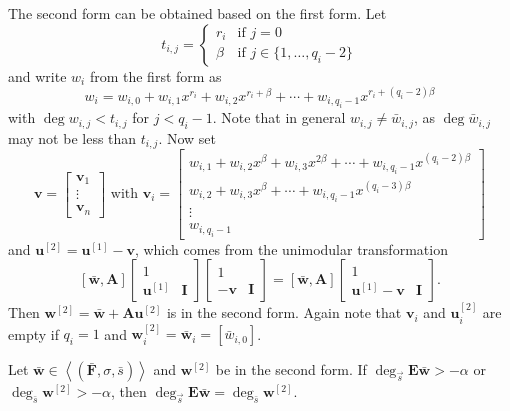 \begin{pf}
The second form can be obtained based on the first form. Let \[
t_{i,j}=\begin{cases}
r_{i} & \mbox{if }j=0\\
\beta & \mbox{if }j\in\{1,\dots,q_{i}-2\}\end{cases}\]
 and write $w_{i}$ from the first form as \begin{equation}
w_{i}=w_{i,0}+w_{i,1}x^{r_{i}}+w_{i,2}x^{r_{i}+\beta}+\cdots+w_{i,q_{i}-1}x^{r_{i}+(q_{i}-2)\beta}\label{eq:wiSeparatedForm}\end{equation}
 with $\deg w_{i,j}<t_{i,j}$ for $j<q_{i}-1$. Note that in general
$w_{i,j}\ne\bar{w}_{i,j}$, as $\deg\bar{w}_{i,j}$ may not be less
than $t_{i,j}$. Now set \[
\mathbf{v}=\begin{bmatrix}\mathbf{v}_{1}\\
\vdots\\
\mathbf{v}_{n}\end{bmatrix}\mbox{ with }\mathbf{v}_{i}=\left[\begin{array}{r}
w_{i,1}+w_{i,2}x^{\beta}+w_{i,3}x^{2\beta}+\cdots+w_{i,q_{i}-1}x^{(q_{i}-2)\beta}\\
w_{i,2}+w_{i,3}x^{\beta}+\cdots+w_{i,q_{i}-1}x^{(q_{i}-3)\beta}\\
\vdots~~~~~\\
w_{i,q_{i}-1}\end{array}\right]\]
 and $\mathbf{u}^{[2]}=\mathbf{u}^{[1]}-\mathbf{v}$, which comes
from the unimodular transformation \[
\left[\bar{\mathbf{w}},\mathbf{A}\right]\left[\begin{array}{c|c}
1\\
\hline \mathbf{\mathbf{u}}^{[1]} & \mathbf{I}\end{array}\right]\left[\begin{array}{c|c}
1\\
\hline -\mathbf{v} & \mathbf{I}\end{array}\right]=\left[\bar{\mathbf{w}},\mathbf{A}\right]\left[\begin{array}{c|c}
1\\
\hline \mathbf{u}^{[1]}-\mathbf{v} & \mathbf{I}\end{array}\right].\]
 Then $\mathbf{w}^{[2]}=\bar{\mathbf{w}}+\mathbf{A}\mathbf{u}^{[2]}$
is in the second form. Again note that $\mathbf{v}_{i}$ and $\mathbf{u}_{i}^{[2]}$
are empty if $q_{i}=1$ and $\mathbf{w}_{i}^{[2]}=\bar{\mathbf{w}}_{i}=[\bar{w}_{i,0}]$.\end{pf}
\begin{lem}
\label{lem:degreeCorrespondence}Let $\bar{\mathbf{w}}\in\left\langle \left(\bar{\mathbf{F}},\sigma,\bar{s}\right)\right\rangle $
and $\mathbf{w}^{[2]}$ be in the second form. If $\deg_{\vec{s}}\mathbf{E}\bar{\mathbf{w}}>-\alpha$
or $\deg_{\bar{s}}\mathbf{w}^{[2]}>-\alpha$, then $\deg_{\vec{s}}\mathbf{E}\bar{\mathbf{w}}=\deg_{\bar{s}}\mathbf{w}^{[2]}$. \end{lem}
